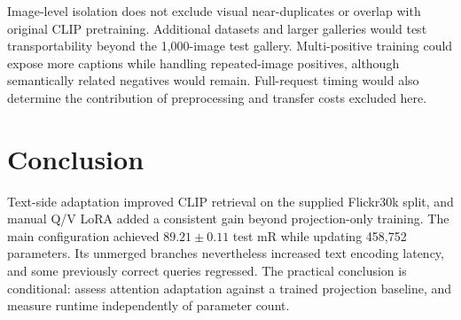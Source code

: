 \documentclass[conference]{IEEEtran}
\begin{document}
Image-level isolation does not exclude visual near-duplicates or overlap with original CLIP pretraining. Additional datasets and larger galleries would test transportability beyond the 1,000-image test gallery. Multi-positive training could expose more captions while handling repeated-image positives, although semantically related negatives would remain. Full-request timing would also determine the contribution of preprocessing and transfer costs excluded here.

\section{Conclusion}
Text-side adaptation improved CLIP retrieval on the supplied Flickr30k split, and manual Q/V LoRA added a consistent gain beyond projection-only training. The main configuration achieved $89.21\pm0.11$ test mR while updating 458,752 parameters. Its unmerged branches nevertheless increased text encoding latency, and some previously correct queries regressed. The practical conclusion is conditional: assess attention adaptation against a trained projection baseline, and measure runtime independently of parameter count.

\clearpage
\raggedbottom
{}


\end{document}
